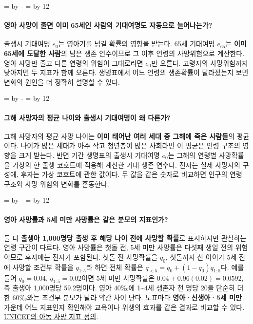 \documentclass[10pt,a4paper]{article}
\newcommand{\ReserveQuestionSpace}{%
  \par\begingroup
  \dimen0=\pagegoal \advance\dimen0 by -\pagetotal
  \dimen2=\baselineskip \multiply\dimen2 by 12
  \ifdim\dimen0<\dimen2 \newpage\fi
  \endgroup}
\begin{document}
\ReserveQuestionSpace
\paragraph{영아 사망이 줄면 이미 65세인 사람의 기대여명도 자동으로 늘어나는가?}
출생시 기대여명 $e_0$는 영아기를 넘길 확률의 영향을 받는다. 65세 기대여명 $e_{65}$는 \textbf{이미 65세에 도달한 사람}의 남은 생존 연수이므로 그 이후 연령의 사망위험으로 계산한다. 영아 사망만 줄고 다른 연령의 위험이 그대로라면 $e_0$만 오른다. 고령자의 사망위험까지 낮아지면 두 지표가 함께 오른다. 생명표에서 어느 연령의 생존확률이 달라졌는지 보면 변화의 원인을 더 정확히 설명할 수 있다.\par

\ReserveQuestionSpace
\paragraph{그해 사망자의 평균 나이와 출생시 기대여명이 왜 다른가?}
그해 사망자의 평균 사망 나이는 \textbf{이미 태어난 여러 세대 중 그해에 죽은 사람들}의 평균이다. 나이가 많은 세대가 아주 작고 청년층이 많은 사회라면 이 평균은 연령 구조의 영향을 크게 받는다. 반면 기간 생명표의 출생시 기대여명 $e_0$는 그해의 연령별 사망확률을 가상의 한 출생 코호트에 적용해 계산한 기대 생존 연수다. 전자는 실제 사망자의 구성에, 후자는 가상 코호트에 관한 값이다. 두 값을 같은 숫자로 비교하면 인구의 연령 구조와 사망 위험의 변화를 혼동한다.\par

\ReserveQuestionSpace
\paragraph{영아 사망률과 5세 미만 사망률은 같은 분모의 지표인가?}
둘 다 \textbf{출생아 1,000명당 출생 후 해당 나이 전에 사망할 확률}로 표시하지만 관찰하는 연령 구간이 다르다. 영아 사망률은 첫돌 전, 5세 미만 사망률은 다섯째 생일 전의 위험이므로 후자에는 전자가 포함된다. 첫돌 전 사망확률을 $q_0$, 첫돌까지 산 아이가 5세 전에 사망할 조건부 확률을 $q_{1:5}$라 하면 전체 확률은 $q_{<5}=q_0+(1-q_0)q_{1:5}$다. 예를 들어 $q_0=0.04$, $q_{1:5}=0.02$이면 5세 미만 사망확률은 $0.04+0.96(0.02)=0.0592$, 즉 출생아 1,000명당 59.2명이다. 영아 40‰에 1\textasciitilde{}4세 생존자 천 명당 20을 단순히 더한 60‰와는 조건부 분모가 달라 약간 차이 난다. 도표마다 \textbf{영아·신생아·5세 미만} 가운데 어느 지표인지 확인해야 교육이나 위생의 효과를 같은 결과로 비교할 수 있다. \href{https://data.unicef.org/topic/child-survival/under-five-mortality/}{UNICEF의 아동 사망 지표 정의}.\par
\end{document}
